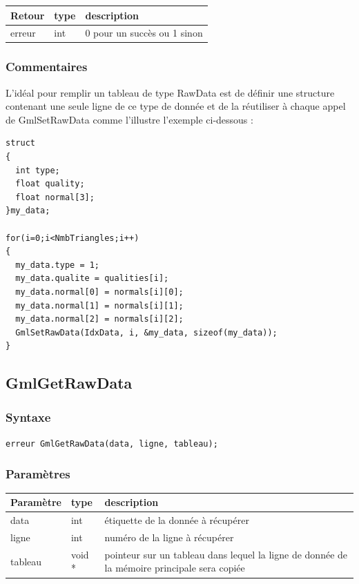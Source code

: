 \documentclass[a4paper,12pt]{article}
\begin{document}
\medskip

\begin{tabular}{|m{2cm}|m{1.5cm}|m{10.5cm}|}
\hline
Retour     & type   & description \\
\hline
erreur     & int    & 0 pour un succès ou 1 sinon \\
\hline
\end{tabular}
\subsubsection*{Commentaires}
L'idéal pour remplir un tableau de type RawData est de définir une structure contenant une seule ligne de ce type de donnée et de la réutiliser à chaque appel de GmlSetRawData comme l'illustre l'exemple ci-dessous :

\begin{tt}
\begin{verbatim}
struct
{
  int type;
  float quality;
  float normal[3];
}my_data;

for(i=0;i<NmbTriangles;i++)
{
  my_data.type = 1;
  my_data.qualite = qualities[i];
  my_data.normal[0] = normals[i][0];
  my_data.normal[1] = normals[i][1];
  my_data.normal[2] = normals[i][2];
  GmlSetRawData(IdxData, i, &my_data, sizeof(my_data));
}
\end{verbatim}
\end{tt}
\normalfont


\subsection{GmlGetRawData}
\subsubsection*{Syntaxe}
{\tt erreur GmlGetRawData(data, ligne, tableau);}
\subsubsection*{Paramètres}

\begin{tabular}{|m{2cm}|m{1.5cm}|m{10.5cm}|}
\hline
Paramètre  & type   & description \\
\hline
data       & int    & étiquette de la donnée à récupérer \\
\hline
ligne      & int    & numéro de la ligne à récupérer \\
\hline
tableau    & void * & pointeur sur un tableau dans lequel la ligne de donnée de la mémoire principale sera copiée \\
\hline
\end{tabular}
\end{document}

